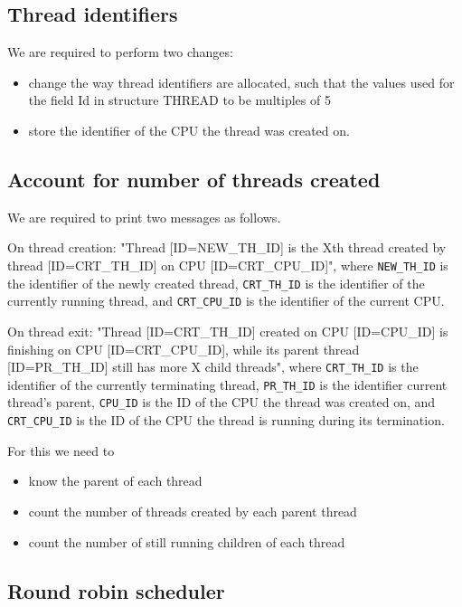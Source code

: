 \documentclass[a4paper,12pt]{report}
\begin{document}
\subsection{Thread identifiers}
We are required to perform two changes:
\begin{itemize}
    \item change the way thread identifiers are allocated, such that the values used for the field Id in structure THREAD to be multiples of 5
    \item store the identifier of the CPU the thread was created on.
\end{itemize}

\subsection{Account for number of threads created}

We are required to print two messages as follows. 

On thread creation:  "Thread [ID=NEW\_TH\_ID] is the Xth thread created by thread [ID=CRT\_TH\_ID] on CPU [ID=CRT\_CPU\_ID]", where \lstinline|NEW_TH_ID| is the identifier of the newly created thread, \lstinline|CRT_TH_ID| is the identifier of the currently running thread, and \lstinline|CRT_CPU_ID| is the identifier of the current CPU. 

On thread exit: "Thread [ID=CRT\_TH\_ID] created on CPU [ID=CPU\_ID] is finishing on CPU [ID=CRT\_CPU\_ID], while its parent thread [ID=PR\_TH\_ID] still has more X child threads", where \lstinline|CRT_TH_ID| is the identifier of the currently terminating thread, \lstinline|PR_TH_ID| is the identifier current thread's parent, \lstinline|CPU_ID| is the ID of the CPU the thread was created on, and \lstinline|CRT_CPU_ID| is the ID of the CPU the thread is running during its termination.

For this we need to
\begin{itemize}
    \item know the parent of each thread
    \item count the number of threads created by each parent thread
    \item count the number of still running children of each thread
\end{itemize}


\subsection{ Round robin scheduler}
\end{document}
